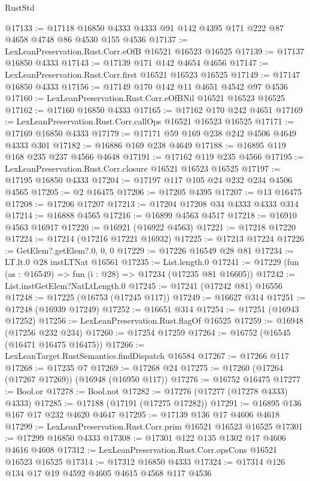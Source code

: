 \begin{lexlean}{RustStd}
\begin{coremodule}
@17133 := @17118 @16850 @4333 @4333 @91 @142 @4395 @171 @222 @87 @4658 @4748 @86 @4530 @155 @4536
@17137 := LexLeanPreservation.Rust.Corr.eOfB @16521 @16523 @16525
@17139 := @17137 @16850 @4333
@17143 := @17139 @171 @142 @4654 @4656
@17147 := LexLeanPreservation.Rust.Corr.first @16521 @16523 @16525
@17149 := @17147 @16850 @4333
@17156 := @17149 @170 @142 @11 @4651 @4542 @97 @4536
@17160 := LexLeanPreservation.Rust.Corr.eOfBNil @16521 @16523 @16525
@17162 := @17160 @16850 @4333
@17165 := @17162 @170 @242 @4651
@17169 := LexLeanPreservation.Rust.Corr.callOps @16521 @16523 @16525
@17171 := @17169 @16850 @4333
@17179 := @17171 @59 @169 @238 @242 @4506 @4649 @4333 @301
@17182 := @16886 @169 @238 @4649
@17188 := @16895 @119 @168 @235 @237 @4566 @4648
@17191 := @17162 @119 @235 @4566
@17195 := LexLeanPreservation.Rust.Corr.closure @16521 @16523 @16525
@17197 := @17195 @16850 @4333
@17204 := @17197 @117 @105 @24 @232 @234 @4506 @4565
@17205 := @2 @16475
@17206 := @17205 @4395
@17207 := @13 @16475
@17208 := @17206 @17207
@17213 := @17204 @17208 @34 @4333 @4333 @314
@17214 := @16888 @4565
@17216 := @16899 @4563 @4517
@17218 := @16910 @4563 @16917
@17220 := @16921 (@16922 @4563)
@17221 := @17218 @17220
@17224 := @17214 (@17216 @17221 @16932)
@17225 := @17213 @17224
@17226 := GetElem?.getElem?.{0, 0, 0}
@17229 := @17226 @16549 @28 @81
@17234 := LT.lt.{0} @28 instLTNat @16561
@17235 := List.length.{0}
@17241 := @17229 (fun (as : @16549) => fun (i : @28) => @17234 (@17235 @81 @16605))
@17242 := List.instGetElem?NatLtLength.{0}
@17245 := @17241 (@17242 @81) @16556
@17248 := @17225 (@16753 (@17245 @117))
@17249 := @16627 @314
@17251 := @17248 (@16939 @17249)
@17252 := @16651 @314
@17254 := @17251 (@16943 @17252)
@17256 := LexLeanPreservation.Rust.flagOf @16525
@17259 := @16948 (@17256 @232 @234)
@17260 := @17254 @17259
@17264 := @16752 (@16545 (@16471 @16475 @16475))
@17266 := LexLeanTarget.RustSemantics.findDispatch @16584
@17267 := @17266 @117
@17268 := @17235 @7
@17269 := @17268 @24
@17275 := @17260 (@17264 (@17267 @17269)) (@16948 (@16950 @117))
@17276 := @16752 @16475
@17277 := Bool.or
@17278 := Bool.not
@17282 := @17276 (@17277 (@17278 @4333) @4333)
@17285 := @17188 (@17191 (@17275 @17282))
@17291 := @16895 @136 @167 @17 @232 @4620 @4647
@17295 := @17139 @136 @17 @4606 @4618
@17299 := LexLeanPreservation.Rust.Corr.prim @16521 @16523 @16525
@17301 := @17299 @16850 @4333
@17308 := @17301 @122 @135 @1302 @17 @4606 @4616 @4608
@17312 := LexLeanPreservation.Rust.Corr.opsCons @16521 @16523 @16525
@17314 := @17312 @16850 @4333
@17324 := @17314 @126 @134 @17 @19 @4592 @4605 @4615 @4568 @117 @4536

\end{coremodule}
\end{lexlean}
